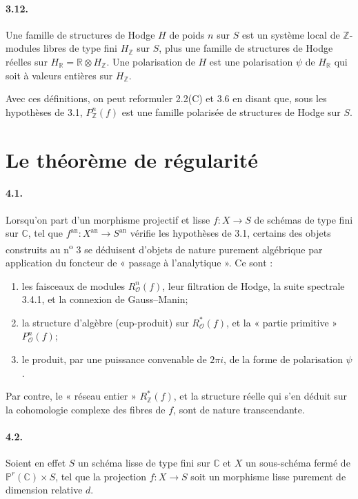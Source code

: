 \documentclass[10pt]{article}
\newcommand{\C}{\mathbb C}
\newcommand{\R}{\mathbb R}
\newcommand{\Z}{\mathbb Z}
\newcommand{\Pj}{\mathbb P}
\newcommand{\cO}{\mathcal O}
\theoremstyle{deligne}
\begin{document}
\paragraph{3.12.}
Une famille de structures de Hodge $H$ de poids $n$ sur $S$ est un système local de $\Z$-modules libres de type fini $H_\Z$ sur $S$, plus une famille de structures de Hodge réelles sur $H_\R=\R\otimes H_\Z$. Une polarisation de $H$ est une polarisation $\psi$ de $H_\R$ qui soit à valeurs entières sur $H_\Z$.

Avec ces définitions, on peut reformuler 2.2(C) et 3.6 en disant que, sous les hypothèses de 3.1, $P_\Z^n(f)$ est une famille polarisée de structures de Hodge sur $S$.

\section{Le théorème de régularité}

\paragraph{4.1.}
Lorsqu'on part d'un morphisme projectif et lisse $f:X\to S$ de schémas de type fini sur $\C$, tel que $f^{\mathrm{an}}:X^{\mathrm{an}}\to S^{\mathrm{an}}$ vérifie les hypothèses de 3.1, certains des objets construits au n\textsuperscript{o} 3 se déduisent d'objets de nature purement algébrique par application du foncteur de « passage à l'analytique ». Ce sont :
\begin{enumerate}[label=\alph*)]
\item les faisceaux de modules $R_\cO^n(f)$, leur filtration de Hodge, la suite spectrale 3.4.1, et la connexion de Gauss--Manin;
\item la structure d'algèbre (cup-produit) sur $R_\cO^*(f)$, et la « partie primitive » $P_\cO^n(f)$;
\item le produit, par une puissance convenable de $2\pi i$, de la forme de polarisation $\psi$.
\end{enumerate}
Par contre, le « réseau entier » $R_\Z^*(f)$, et la structure réelle qui s'en déduit sur la cohomologie complexe des fibres de $f$, sont de nature transcendante.

\paragraph{4.2.}
Soient en effet $S$ un schéma lisse de type fini sur $\C$ et $X$ un sous-schéma fermé de $\Pj^r(\C)\times S$, tel que la projection $f:X\to S$ soit un morphisme lisse purement de dimension relative $d$.
\end{document}
